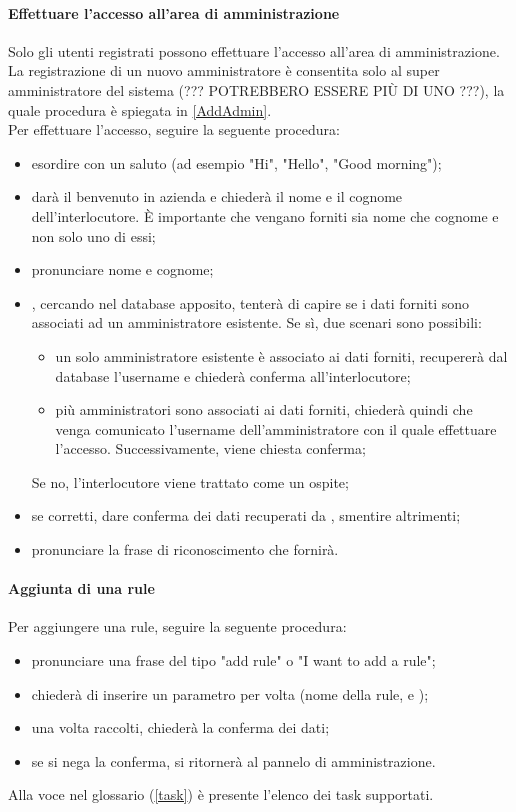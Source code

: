 \paragraph{Effettuare l'accesso all'area di amministrazione}\label{adminArea}
Solo gli utenti registrati possono effettuare l'accesso all'area di amministrazione. La registrazione di un nuovo amministratore è consentita solo al super amministratore del sistema (??? POTREBBERO ESSERE PIÙ DI UNO ???), la quale procedura è spiegata in \ref{AddAdmin}. \\
Per effettuare l'accesso, seguire la seguente procedura:
\begin{itemize}
	\item esordire con un saluto (ad esempio "Hi", "Hello", "Good morning");
	\item \PROGETTO{} darà il benvenuto in azienda e chiederà il nome e il cognome dell'interlocutore. È importante che vengano forniti sia nome che cognome e non solo uno di essi;
	\item pronunciare nome e cognome;
	\item \PROGETTO, cercando nel database apposito, tenterà di capire se i dati forniti sono associati ad un amministratore esistente. Se sì, due scenari sono possibili:
	\begin{itemize}
		\item un solo amministratore esistente è associato ai dati forniti, \PROGETTO{} recupererà dal database l'username e chiederà conferma all'interlocutore;
		\item più amministratori sono associati ai dati forniti, \PROGETTO{} chiederà quindi che venga comunicato l'username dell'amministratore con il quale effettuare l'accesso. Successivamente, viene chiesta conferma; 
	\end{itemize}
	Se no, l'interlocutore viene trattato come un ospite;
	\item se corretti, dare conferma dei dati recuperati da \PROGETTO, smentire altrimenti;
	\item pronunciare la frase di riconoscimento che \PROGETTO{} fornirà.
\end{itemize}
\paragraph{Aggiunta di una rule}
Per aggiungere una rule, seguire la seguente procedura:
\begin{itemize}
	\item pronunciare una frase del tipo "add rule" o "I want to add a rule";
	\item \PROGETTO{} chiederà di inserire un parametro per volta (nome della rule,  e );
	\item una volta raccolti, \PROGETTO{} chiederà la conferma dei dati;
	\item se si nega la conferma, si ritornerà al pannelo di amministrazione.
\end{itemize}
Alla voce  nel glossario (\ref{task}) è presente l'elenco dei task supportati.
